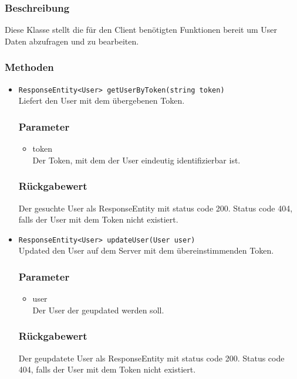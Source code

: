 \documentclass[a4paper]{scrreprt}
\begin{document}
\subsubsection*{Beschreibung}
Diese Klasse stellt die für den Client benötigten Funktionen bereit um User Daten abzufragen und zu bearbeiten. 

\subsubsection*{Methoden}
\begin{addmargin}[25pt]{0pt}
\begin{itemize}

\item \texttt{ResponseEntity<User> getUserByToken(string token)}\\
	Liefert den User mit dem übergebenen Token. 

	\subsubsection*{Parameter}
	\begin{itemize}
	\item token \\
		Der Token, mit dem der User eindeutig identifizierbar ist.
	\end{itemize}

	\subsubsection*{Rückgabewert}
	Der gesuchte User als ResponseEntity mit status code 200.
	Status code 404, falls der User mit dem Token nicht existiert.

\item \texttt{ResponseEntity<User> updateUser(User user)}\\
	Updated den User auf dem Server mit dem übereinstimmenden Token.

	\subsubsection*{Parameter}
	\begin{itemize}
	\item user \\
		Der User der geupdated werden soll.
	\end{itemize}

	\subsubsection*{Rückgabewert}
	Der geupdatete User als ResponseEntity mit status code 200.
	Status code 404, falls der User mit dem Token nicht existiert.
	

\end{itemize}
\end{addmargin}
\end{document}
